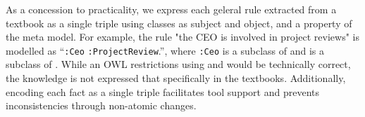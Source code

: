\documentclass[sw]{iosart2x}
\begin{document}
As a concession to practicality, we express each geleral rule extracted from a textbook as a single triple using classes as subject and object, and a property of the meta model.
For example, the rule "the CEO is involved in project reviews" is modelled as \enquote{\texttt{:Ceo}  \texttt{:ProjectReview}.}, where \texttt{:Ceo} is a subclass of  and  is a subclass of .
While an OWL restrictions using  and  would be technically correct, the knowledge is not expressed that specifically in the textbooks.
Additionally, encoding each fact as a single triple facilitates tool support and prevents inconsistencies through non-atomic changes.

\paragraph{}

\end{document}
